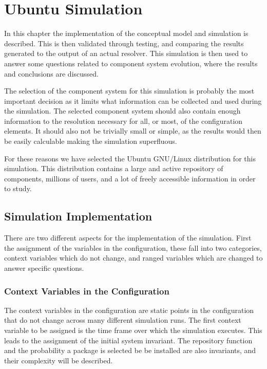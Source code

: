 
\chapter{Ubuntu Simulation}
\label{ubunutsimulation}
{}In this chapter the implementation of the conceptual model and simulation is described.
{}This is then validated through testing, and comparing the results generated to the output of an actual resolver. 
{}This simulation is then used to answer some questions related to component system evolution, where the results and conclusions are discussed.

The selection of the component system for this simulation is probably the most important decision as it limits what information can be collected and used during the simulation.
The selected component system should also contain enough information to the resolution necessary for all, or most, of the configuration elements.
It should also not be trivially small or simple, as the results would then be easily calculable making the simulation superfluous.

For these reasons we have selected the Ubuntu GNU/Linux distribution for this simulation.
This distribution contains a large and active repository of components, millions of users, and a lot of freely accessible information in order to study.

\section{Simulation Implementation}
There are two different aspects for the implementation of the simulation.
First the assignment of the variables in the configuration, these fall into two categories, context variables which do not change, 
and ranged variables which are changed to answer specific questions.

\subsection{Context Variables in the Configuration}
The context variables in the configuration are static points in the configuration that do not change across many different simulation runs.
The first context variable to be assigned is the time frame over which the simulation executes.
This leads to the assignment of the initial system invariant.
The repository function and the probability a package is selected be be installed are also invariants, and their complexity will be described.

